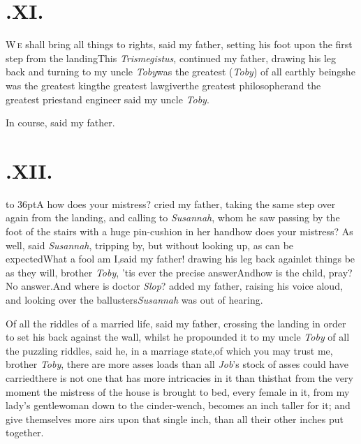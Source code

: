 \documentclass{article}
\begin{document}
\newpage
\null\smallskip
\section{.\enspace XI.}

\lettrine{W}{\,e} shall bring all things to rights, said my father, setting his foot upon
the first step from the landing\tsh This \textit{Trismegistus}, continued my father,
drawing his leg back and turning to my uncle \textit{Toby}\tsk was the greatest
(\textit{Toby}) of all earthly beings\tsk he was the greatest king\tsk the greatest
lawgiver\tsk the greatest philosopher\tsk and the greatest
priest\tsh and engineer\tsk
said my uncle \textit{Toby}.\tsk

\tsk In course, said my father.

\newpage
\null\smallskip
\section{.\enspace XII.}

\lettrine{\hbox to 36pt{\hskip -3pt\Tsk A}}{} how does your mistress?\break
cried my father, taking the\break
same step over again from the landing, and calling to
\textit{Susannah}, whom he saw passing by the foot of the
stairs with a huge pin-cushion in her hand\tsk how does your
mistress? As well, said \textit{Susannah}, tripping by, but
without looking up, as can be expected\tsk What a fool am
I,\break said my father! drawing his leg back again\tsk let things
be as they will, brother \textit{Toby}, ’tis ever the
precise answer\tsk And\break how is the child, pray?\tsk No
answer.\break And where is doctor \textit{Slop}?  added my
father, raising his voice aloud, and looking over the
ballusters\tsk \textit{Susannah} was out of hearing.

\newpage
Of all the riddles of a married life, said my father, crossing the landing in order
to set his back against the wall, whilst he propounded it to my uncle \textit{Toby}
\tsk of all the puzzling riddles, said he, in a marriage state,\tsk of which you may
trust me, brother \textit{Toby}, there are more asses loads than all \textit{Job}’s
stock of asses could have carried\tsk there is not one that has more intricacies in
it than this\tsk that from the very moment the mistress of the house is brought to
bed, every female in it, from my lady’s gentlewoman down to the cinder-wench,
becomes an inch taller for it; and give themselves more airs upon that single inch,
than all their other inches put together.
\end{document}
